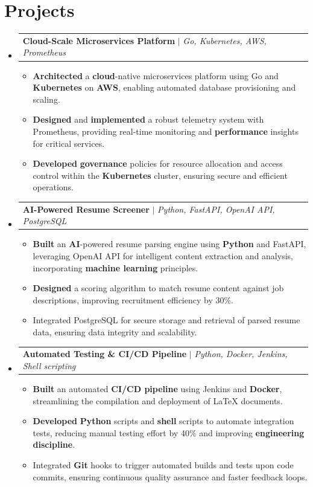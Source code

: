 \documentclass[letterpaper,11pt]{article}
\makeatletter
\newcommand{\resumeItem}[1]{\item\small{#1 \vspace{-2pt}}}
\newcommand{\resumeProjectHeading}[2]{\vspace{-2pt}\item\begin{tabular*}{0.97\textwidth}{l@{\extracolsep{\fill}}r}\small#1 & #2 \\\end{tabular*}\vspace{-7pt}}
\newcommand{\resumeSubHeadingListStart}{\begin{itemize}[leftmargin=0.15in, label={}]}
\newcommand{\resumeSubHeadingListEnd}{\end{itemize}}
\newcommand{\resumeItemListStart}{\begin{itemize}}
\newcommand{\resumeItemListEnd}{\end{itemize}\vspace{-5pt}}
\makeatother
\begin{document}
\section{Projects}
\resumeSubHeadingListStart
    \resumeProjectHeading
        {\textbf{Cloud-Scale Microservices Platform} $|$ \emph{Go, Kubernetes, AWS, Prometheus}}{}
        \resumeItemListStart
            \resumeItem{\textbf{Architected} a \textbf{cloud}-native microservices platform using Go and \textbf{Kubernetes} on \textbf{AWS}, enabling automated database provisioning and scaling.}
            \resumeItem{\textbf{Designed} and \textbf{implemented} a robust telemetry system with Prometheus, providing real-time monitoring and \textbf{performance} insights for critical services.}
            \resumeItem{\textbf{Developed} \textbf{governance} policies for resource allocation and access control within the \textbf{Kubernetes} cluster, ensuring secure and efficient operations.}
        \resumeItemListEnd
    \resumeProjectHeading
        {\textbf{AI-Powered Resume Screener} $|$ \emph{Python, FastAPI, OpenAI API, PostgreSQL}}{}
        \resumeItemListStart
            \resumeItem{\textbf{Built} an \textbf{AI}-powered resume parsing engine using \textbf{Python} and FastAPI, leveraging OpenAI API for intelligent content extraction and analysis, incorporating \textbf{machine learning} principles.}
            \resumeItem{\textbf{Designed} a scoring algorithm to match resume content against job descriptions, improving recruitment efficiency by 30\%.}
            \resumeItem{Integrated PostgreSQL for secure storage and retrieval of parsed resume data, ensuring data integrity and scalability.}
        \resumeItemListEnd
    \resumeProjectHeading
        {\textbf{Automated Testing \& CI/CD Pipeline} $|$ \emph{Python, Docker, Jenkins, Shell scripting}}{}
        \resumeItemListStart
            \resumeItem{\textbf{Built} an automated \textbf{CI/CD pipeline} using Jenkins and \textbf{Docker}, streamlining the compilation and deployment of LaTeX documents.}
            \resumeItem{\textbf{Developed} \textbf{Python} scripts and \textbf{shell} scripts to automate integration tests, reducing manual testing effort by 40\% and improving \textbf{engineering discipline}.}
            \resumeItem{Integrated \textbf{Git} hooks to trigger automated builds and tests upon code commits, ensuring continuous quality assurance and faster feedback loops.}
        \resumeItemListEnd
\resumeSubHeadingListEnd

\end{document}
